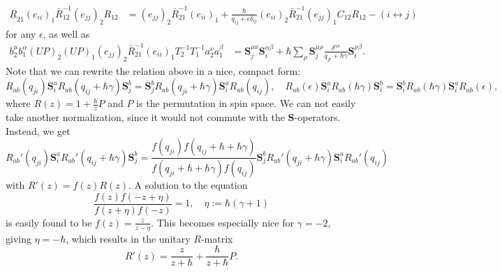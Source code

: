 \documentclass[11pt]{report}
\theoremstyle{definition}
\theoremstyle{remark}
\theoremstyle{remark}
\begin{document}
\begin{align*}
\underline{R}_{21} (e_{ii})_1 \bar R_{12}^{-1} (e_{jj})_2 R_{12}
&= (e_{jj})_2 \bar R_{21}^{-1} (e_{ii})_1 + \frac{\hbar}{q_{ij}+\epsilon\delta_{ij}} (e_{ii})_2 \bar R_{21}^{-1} (e_{jj})_1 C_{12} R_{12} - (i \leftrightarrow j)
\end{align*}
for any $\epsilon$, as well as
\begin{align*}
b_2^\mu b_1^\alpha (UP)_2 (UP)_1 (e_{jj})_2 \bar R_{21}^{-1} (e_{ii})_1 T_2^{-1} T_1^{-1} a_2^\nu a_1^\beta &= \mathbf{S}_j^{\mu\nu} \mathbf{S}_i^{\alpha\beta} + \hbar \sum_\rho \mathbf{S}_j^{\mu\rho} \frac{\delta^{\alpha\nu}}{q_{ji}+\hbar\gamma} \mathbf{S}_i^{\rho\beta}.
\end{align*}
Note that we can rewrite the relation above in a nice, compact form:
\begin{equation*}
R_{ab}(q_{ji}) \mathbf{S}_i^a R_{ab}(q_{ij}+\hbar\gamma) \mathbf{S}_j^b = \mathbf{S}_j^b R_{ab}(q_{ji}+\hbar\gamma) \mathbf{S}_i^a R_{ab}(q_{ij}), \quad R_{ab}(\epsilon) \mathbf{S}_i^a R_{ab}(\hbar\gamma) \mathbf{S}_i^b = \mathbf{S}_i^b R_{ab}(\hbar\gamma) \mathbf{S}_i^a R_{ab}(\epsilon),
\end{equation*}
where $R(z) = 1+\frac{\hbar}{z} P$ and $P$ is the permutation in spin space. We can not easily take another normalization, since it would not commute with the $\mathbf{S}$-operators. Instead, we get
\begin{equation*}
R_{ab}'(q_{ji}) \mathbf{S}_i^a R_{ab}'(q_{ij}+\hbar\gamma) \mathbf{S}_j^b = \frac{f(q_{ji}) f(q_{ij}+\hbar+\hbar\gamma)}{f(q_{ji}+\hbar+\hbar\gamma) f(q_{ij})} \mathbf{S}_j^b R_{ab}'(q_{ji}+\hbar\gamma) \mathbf{S}_i^a R_{ab}'(q_{ij})
\end{equation*}
with $R'(z) = f(z) R(z)$. A solution to the equation
\begin{equation*}
\frac{f(z) f(-z+\eta)}{f(z+\eta) f(-z)} = 1, \quad \eta := \hbar(\gamma+1)
\end{equation*}
is easily found to be $f(z) = \frac{z}{z-\eta}$. This becomes especially nice for $\gamma = -2$, giving $\eta = -\hbar$, which results in the unitary $R$-matrix
\begin{equation*}
R'(z) = \frac{z}{z+\hbar}+\frac{\hbar}{z+\hbar} P.
\end{equation*}
\end{document}
